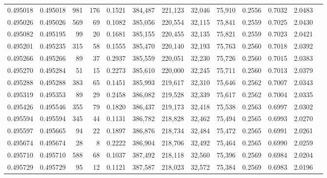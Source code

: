 \begin{tabular}{rrrrrrrrrrrrr}
0.495018 & 0.495018 &   981 &   176 &                                     0.1521 & 384,487 & 221,123 &  32,046 &  75,910 & 0.2556 & 0.7032 & 2.0483 \\
0.495026 & 0.495026 &   569 &    69 &                                     0.1082 & 385,056 & 220,554 &  32,115 &  75,841 & 0.2559 & 0.7025 & 2.0430 \\
0.495082 & 0.495195 &    99 &    20 &                                     0.1681 & 385,155 & 220,455 &  32,135 &  75,821 & 0.2559 & 0.7023 & 2.0421 \\
0.495201 & 0.495235 &   315 &    58 &                                     0.1555 & 385,470 & 220,140 &  32,193 &  75,763 & 0.2560 & 0.7018 & 2.0392 \\
0.495266 & 0.495266 &    89 &    37 &                                     0.2937 & 385,559 & 220,051 &  32,230 &  75,726 & 0.2560 & 0.7015 & 2.0383 \\
0.495270 & 0.495284 &    51 &    15 &                                     0.2273 & 385,610 & 220,000 &  32,245 &  75,711 & 0.2560 & 0.7013 & 2.0379 \\
0.495288 & 0.495288 &   383 &    65 &                                     0.1451 & 385,993 & 219,617 &  32,310 &  75,646 & 0.2562 & 0.7007 & 2.0343 \\
0.495319 & 0.495353 &    89 &    29 &                                     0.2458 & 386,082 & 219,528 &  32,339 &  75,617 & 0.2562 & 0.7004 & 2.0335 \\
0.495426 & 0.495546 &   355 &    79 &                                     0.1820 & 386,437 & 219,173 &  32,418 &  75,538 & 0.2563 & 0.6997 & 2.0302 \\
0.495594 & 0.495594 &   345 &    44 &                                     0.1131 & 386,782 & 218,828 &  32,462 &  75,494 & 0.2565 & 0.6993 & 2.0270 \\
0.495597 & 0.495665 &    94 &    22 &                                     0.1897 & 386,876 & 218,734 &  32,484 &  75,472 & 0.2565 & 0.6991 & 2.0261 \\
0.495674 & 0.495674 &    28 &     8 &                                     0.2222 & 386,904 & 218,706 &  32,492 &  75,464 & 0.2565 & 0.6990 & 2.0259 \\
0.495710 & 0.495710 &   588 &    68 &                                     0.1037 & 387,492 & 218,118 &  32,560 &  75,396 & 0.2569 & 0.6984 & 2.0204 \\
0.495729 & 0.495729 &    95 &    12 &                                     0.1121 & 387,587 & 218,023 &  32,572 &  75,384 & 0.2569 & 0.6983 & 2.0196 \\

\end{tabular}
